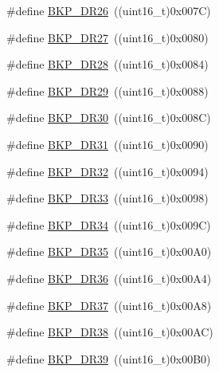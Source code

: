 \begin{DoxyCompactItemize}
\item 
\#define \mbox{\hyperlink{group___data___backup___register_ga06b425e00596cf4c6a43e638f7542e0a}{B\+K\+P\+\_\+\+D\+R26}}~((uint16\+\_\+t)0x007\+C)
\item 
\#define \mbox{\hyperlink{group___data___backup___register_ga282338412a00b49dc1fde17f8eacbae9}{B\+K\+P\+\_\+\+D\+R27}}~((uint16\+\_\+t)0x0080)
\item 
\#define \mbox{\hyperlink{group___data___backup___register_ga02762501319f1b7e7c01b56d45c45cf9}{B\+K\+P\+\_\+\+D\+R28}}~((uint16\+\_\+t)0x0084)
\item 
\#define \mbox{\hyperlink{group___data___backup___register_ga94e935c3e7ce7261d1823e888a8216c5}{B\+K\+P\+\_\+\+D\+R29}}~((uint16\+\_\+t)0x0088)
\item 
\#define \mbox{\hyperlink{group___data___backup___register_ga7114464779c0f0e008ec79f66aac9568}{B\+K\+P\+\_\+\+D\+R30}}~((uint16\+\_\+t)0x008\+C)
\item 
\#define \mbox{\hyperlink{group___data___backup___register_gadb5b953e765da9d658600151dde63fa3}{B\+K\+P\+\_\+\+D\+R31}}~((uint16\+\_\+t)0x0090)
\item 
\#define \mbox{\hyperlink{group___data___backup___register_gaecc9c23e89fff9a5846305ec391d5cda}{B\+K\+P\+\_\+\+D\+R32}}~((uint16\+\_\+t)0x0094)
\item 
\#define \mbox{\hyperlink{group___data___backup___register_ga9a52ed4d0d70fc9d815d5e15945ad0d8}{B\+K\+P\+\_\+\+D\+R33}}~((uint16\+\_\+t)0x0098)
\item 
\#define \mbox{\hyperlink{group___data___backup___register_ga8553dfcf67aad9107544cf52bf0a54a5}{B\+K\+P\+\_\+\+D\+R34}}~((uint16\+\_\+t)0x009\+C)
\item 
\#define \mbox{\hyperlink{group___data___backup___register_ga54e494fd651d2e1970ab7e5d6528af21}{B\+K\+P\+\_\+\+D\+R35}}~((uint16\+\_\+t)0x00\+A0)
\item 
\#define \mbox{\hyperlink{group___data___backup___register_ga212028eb8d981756b3bc78492434d19a}{B\+K\+P\+\_\+\+D\+R36}}~((uint16\+\_\+t)0x00\+A4)
\item 
\#define \mbox{\hyperlink{group___data___backup___register_ga6c11b636a33c5b352d267355e502b34d}{B\+K\+P\+\_\+\+D\+R37}}~((uint16\+\_\+t)0x00\+A8)
\item 
\#define \mbox{\hyperlink{group___data___backup___register_ga88f4c7dd39ba83b66159b2c808275a09}{B\+K\+P\+\_\+\+D\+R38}}~((uint16\+\_\+t)0x00\+A\+C)
\item 
\#define \mbox{\hyperlink{group___data___backup___register_ga1656f56588b474b1f48bb96380cdfd4a}{B\+K\+P\+\_\+\+D\+R39}}~((uint16\+\_\+t)0x00\+B0)

\end{DoxyCompactItemize}

